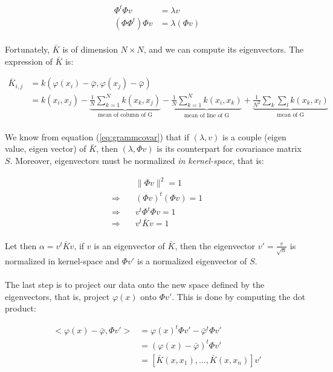 \begin{align}\label{eq:grammcovar}
\Phi^t\Phi v &= \lambda v \\
(\Phi\Phi^t)\Phi v &= \lambda (\Phi v)
\end{align}

\paragraph{}
Fortunately, $\bar{K}$ is of dimension $N \times N$, and we can compute its eigenvectors. The expression of $\bar{K}$ is:

\begin{align*}
\bar{K}_{i, j} &= k(\varphi(x_i) - \bar{\varphi}, \varphi(x_j) - \bar{\varphi}) \\
&= k(x_i, x_j)
	- \underbrace{\frac{1}{N}\sum_{k = 1}^N k(x_k, x_j)}_{\text{mean of column of G}}
    - \underbrace{\frac{1}{N}\sum_{k = 1}^N k(x_i, x_k)}_{\text{mean of line of G}}
    + \underbrace{\frac{1}{N^2}\sum_k\sum_l k(x_k, x_l)}_{\text{mean of G}}
\end{align*}

\paragraph{}
We know from equation (\ref{eq:grammcovar}) that if $(\lambda, v)$ is a couple (eigen value, eigen vector) of $\bar{K}$, then $(\lambda, \Phi v)$ is its counterpart for covariance matrix $S$. Moreover, eigenvectors must be normalized \emph{in kernel-space}, that is:

\begin{align*}
&\| \Phi v \|^2 = 1 \\
\Rightarrow\quad &(\Phi v)^t(\Phi v) = 1 \\
\Rightarrow\quad &v^t\Phi^t\Phi v = 1 \\
\Rightarrow\quad &v^t \bar{K} v = 1
\end{align*}

\paragraph{}
Let then $\alpha = v^t \bar{K} v$, if $v$ is an eigenvector of $\bar{K}$, then the eigenvector $v' = \frac{v}{\sqrt{\alpha}}$ is normalized in kernel-space and $\Phi v'$ is a normalized eigenvector of $S$.


\paragraph{}
The last step is to project our data onto the new space defined by the eigenvectors, that is, project $\varphi(x)$ onto $\Phi v'$. This is done by computing the dot product:

\begin{align*}
<\varphi(x) - \bar{\varphi}, \Phi v'> &= \varphi(x)^t\Phi v' - \bar{\varphi}^t\Phi v' \\
&= (\varphi(x) - \bar{\varphi})^t\Phi v' \\
&= [\bar{K}(x, x_1), \ldots, \bar{K}(x, x_n)] v'
\end{align*}